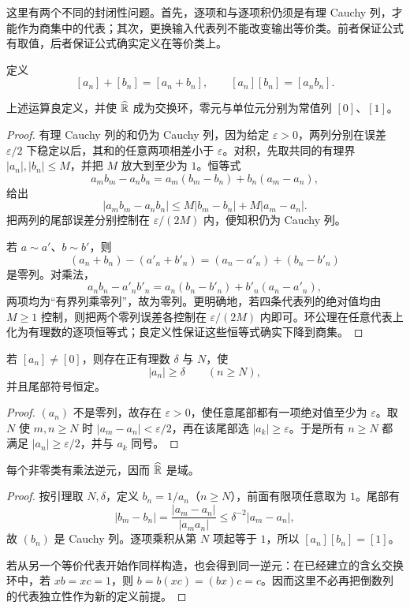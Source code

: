 这里有两个不同的封闭性问题。首先，逐项和与逐项积仍须是有理 Cauchy 列，才能作为商集中的代表；其次，更换输入代表列不能改变输出等价类。前者保证公式有取值，后者保证公式确实定义在等价类上。


定义
\[
 [a_n]+[b_n]=[a_n+b_n],\qquad
 [a_n][b_n]=[a_nb_n].
\]

\begin{theorem}
上述运算良定义，并使 \(\widehat{\mathbb{R}}\) 成为交换环，零元与单位元分别为常值列 \([0]\)、\([1]\)。
\end{theorem}

\begin{proof}
有理 Cauchy 列的和仍为 Cauchy 列，因为给定 \(\varepsilon>0\)，两列分别在误差 \(\varepsilon/2\) 下稳定以后，其和的任意两项相差小于 \(\varepsilon\)。对积，先取共同的有理界 \(|a_n|,|b_n|\le M\)，并把 \(M\) 放大到至少为 \(1\)。恒等式
\[
 a_mb_m-a_nb_n=a_m(b_m-b_n)+b_n(a_m-a_n),
\]
给出
\[
 |a_mb_m-a_nb_n|
 \le M|b_m-b_n|+M|a_m-a_n|.
\]
把两列的尾部误差分别控制在 \(\varepsilon/(2M)\) 内，便知积仍为 Cauchy 列。

若 \(a\sim a'\)、\(b\sim b'\)，则
\[
 (a_n+b_n)-(a'_n+b'_n)=(a_n-a'_n)+(b_n-b'_n)
\]
是零列。对乘法，
\[
 a_nb_n-a'_nb'_n=a_n(b_n-b'_n)+b'_n(a_n-a'_n),
\]
两项均为“有界列乘零列”，故为零列。更明确地，若四条代表列的绝对值均由 \(M\ge1\) 控制，则把两个零列误差各控制在 \(\varepsilon/(2M)\) 内即可。环公理在任意代表上化为有理数的逐项恒等式；良定义性保证这些恒等式确实下降到商集。
\end{proof}

\begin{lemma}[非零类远离零]
若 \([a_n]\ne[0]\)，则存在正有理数 \(\delta\) 与 \(N\)，使
\[
 |a_n|\ge\delta\qquad(n\ge N),
\]
并且尾部符号恒定。
\end{lemma}

\begin{proof}
\((a_n)\) 不是零列，故存在 \(\varepsilon>0\)，使任意尾部都有一项绝对值至少为 \(\varepsilon\)。取 \(N\) 使 \(m,n\ge N\) 时 \(|a_m-a_n|<\varepsilon/2\)，再在该尾部选 \(|a_k|\ge\varepsilon\)。于是所有 \(n\ge N\) 都满足 \(|a_n|\ge\varepsilon/2\)，并与 \(a_k\) 同号。
\end{proof}

\begin{theorem}
每个非零类有乘法逆元，因而 \(\widehat{\mathbb{R}}\) 是域。
\end{theorem}

\begin{proof}
按引理取 \(N,\delta\)，定义 \(b_n=1/a_n\)（\(n\ge N\)），前面有限项任意取为 \(1\)。尾部有
\[
 |b_m-b_n|=\frac{|a_m-a_n|}{|a_ma_n|}
 \le\delta^{-2}|a_m-a_n|,
\]
故 \((b_n)\) 是 Cauchy 列。逐项乘积从第 \(N\) 项起等于 \(1\)，所以 \([a_n][b_n]=[1]\)。

若从另一个等价代表开始作同样构造，也会得到同一逆元：在已经建立的含幺交换环中，若 \(xb=xc=1\)，则 \(b=b(xc)=(bx)c=c\)。因而这里不必再把倒数列的代表独立性作为新的定义前提。
\end{proof}

